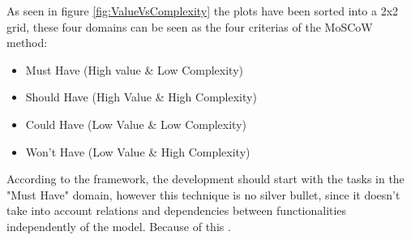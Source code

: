 As seen in figure \ref{fig:ValueVsComplexity} the plots have been sorted into a 2x2 grid, these four domains can be seen as the four criterias of the MoSCoW method: 
\begin{itemize}
    \item Must Have   (High value \& Low Complexity)
    \item Should Have (High Value \& High Complexity)
    \item Could Have  (Low Value \& Low Complexity)
    \item Won't Have  (Low Value \& High Complexity)
\end{itemize}

According to the framework, the development should start with the tasks in the "Must Have" domain, however this technique is no silver bullet, since it doesn't take into account relations and dependencies between functionalities independently of the model. Because of this .








  






